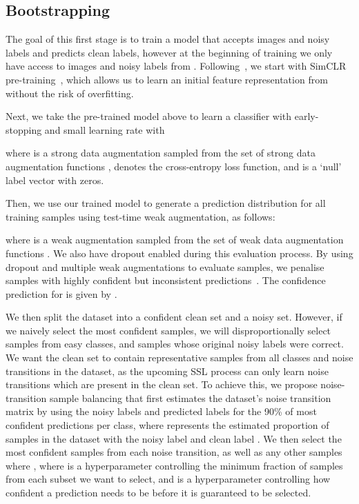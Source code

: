 \documentclass[10pt,twocolumn,letterpaper]{article}
\begin{document}
\subsection{Bootstrapping}
\label{sec:bootstrapping}

The goal of this first stage is to train a model that accepts images and noisy labels and predicts clean labels, however at the beginning of training we only have access to images and noisy labels from . 
Following~\cite{van2020scan, zheltonozhskii2022contrast}, we start with SimCLR pre-training~\cite{chen2020simple}, which allows us to learn an initial feature representation from  without the risk of overfitting.


Next, we take the pre-trained model above to learn a classifier with early-stopping and small learning rate with

where  is a strong data augmentation sampled from the set of strong data augmentation functions ,   denotes the cross-entropy loss function, and  is a `null' label vector with  zeros.

Then, we use our trained model to generate a prediction distribution for all training samples using test-time weak augmentation, as follows:

where  is a weak augmentation sampled from the set of weak data augmentation functions . We also have dropout enabled during this evaluation process. By using dropout and multiple weak augmentations to evaluate samples, we penalise samples with highly confident but inconsistent predictions~\cite{zhang2021learning}. 
The confidence prediction for  is given by . 

We then split the dataset into a confident clean set and a noisy set. However, if we naively select the most confident samples, we will disproportionally select samples from easy classes, and samples whose original noisy labels were correct.
We want the clean set to contain representative samples from all classes and noise transitions in the dataset, as the upcoming SSL process can only learn noise transitions which are present in the clean set. 
To achieve this, we propose noise-transition sample balancing that
first estimates the dataset's noise transition matrix  by using the noisy labels and predicted labels for the 90\% of most confident predictions per class, where  represents the estimated proportion of samples in the dataset with the noisy label  and clean label . 
We then select the  most confident samples from each noise transition, as well as any other samples  where , where  is a hyperparameter controlling the minimum fraction of samples from each subset we want to select, and  is a hyperparameter controlling how confident a prediction needs to be before it is guaranteed to be selected.
\end{document}
